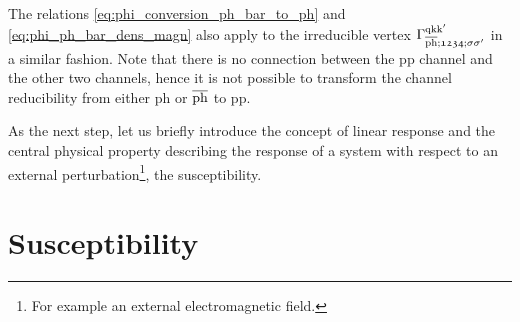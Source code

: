 \documentclass[../../main.tex]{subfiles}
\begin{document}
The relations \eqref{eq:phi_conversion_ph_bar_to_ph} and \eqref{eq:phi_ph_bar_dens_magn} also apply to the irreducible vertex $\Gamma_{\overline{\text{ph}};\mathfrak{1234};\sigma\sigma'}^{\text{q}\text{k}\text{k}'}$ in a similar fashion. Note that there is no connection between the pp channel and the other two channels, hence it is not possible to transform the channel reducibility from either ph or $\overline{\text{ph}}$ to pp.

As the next step, let us briefly introduce the concept of linear response and the central physical property describing the response of a system with respect to an external perturbation\footnote{For example an external electromagnetic field.}, the susceptibility.

\section{Susceptibility}
\end{document}
